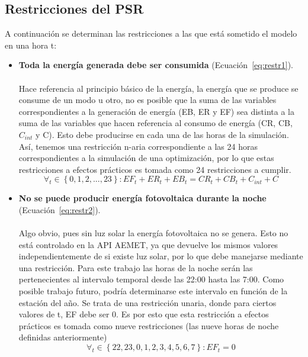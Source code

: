 \subsection{Restricciones del PSR}
A continuación se determinan las restricciones a las que está sometido el modelo en una hora t:
\begin{itemize}
\item \textbf{Toda la energía generada debe ser consumida} (Ecuación~\ref{eq:restr1}).\\ \\Hace referencia al principio básico de la energía, la energía que se produce se consume de un modo u otro, no es posible que la suma de las variables correspondientes a la generación de energía (EB, ER y EF) sea distinta a la suma de las variables que hacen referencia al consumo de energía (CR, CB, $ C_{int} $ y C). Esto debe producirse en cada una de las horas de la simulación. Así, tenemos una restricción n-aria correspondiente a las 24 horas correspondientes a la simulación de una optimización, por lo que estas restricciones a efectos prácticos es tomada como 24 restricciones a cumplir.
\begin{equation}
        \label{eq:restr1}
        \forall_{t} \in \left\{ 0, 1, 2, ..., 23 \right\} : EF_{t}+ER_{t}+EB_{t} = CR_{t}+CB_{t}+C_{int}+C
\end{equation}

\item \textbf{No se puede producir energía fotovoltaica durante la noche} (Ecuación~\ref{eq:restr2}).\\ \\Algo obvio, pues sin luz solar la energía fotovoltaica no se genera. Esto no está controlado en la API AEMET, ya que devuelve los mismos valores independientemente de si existe luz solar, por lo que debe manejarse mediante una restricción. Para este trabajo las horas de la noche serán las pertenecientes al intervalo temporal desde las 22:00 hasta las 7:00. Como posible trabajo futuro, podría determinarse este intervalo en función de la estación del año. Se trata de una restricción unaria, donde para ciertos valores de t, EF debe ser 0. Es por esto que esta restricción a efectos prácticos es tomada como nueve restricciones (las nueve horas de noche definidas anteriormente)
\begin{equation}
        \label{eq:restr2}
       \forall_{t} \in \left\{ 22, 23, 0, 1, 2, 3, 4, 5, 6, 7 \right\} : EF_{t} = 0
\end{equation}


\end{itemize}
